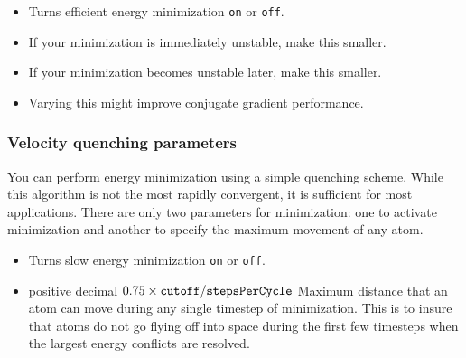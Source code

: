 \begin{itemize}

\item
{}
{Turns efficient energy minimization {\tt on} or {\tt off}.}

\item
{}
{If your minimization is immediately unstable, make this smaller.}

\item
{}
{If your minimization becomes unstable later, make this smaller.}

\item
{}
{Varying this might improve conjugate gradient performance.}

\end{itemize}

\subsubsection{Velocity quenching parameters}

You can perform energy minimization using a simple quenching
scheme.   While this algorithm is not the most rapidly convergent, it
is sufficient for most applications.  There are only two parameters
for minimization:  one to activate minimization and another
to specify the maximum movement of any atom.  

\begin{itemize}

\item
{}
{Turns slow energy minimization {\tt on} or {\tt off}.}

\item
{}
{positive decimal}
{$0.75\times\mbox{{\tt cutoff}}/\mbox{{\tt stepsPerCycle}}$}
{Maximum distance that an atom can move during any single timestep of
minimization.  This is to insure that atoms do not go flying off into
space during the first few timesteps when the largest energy conflicts
are resolved.}

\end{itemize}


